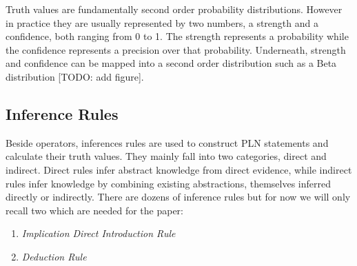 \documentclass[runningheads]{llncs}
\begin{document}
Truth values are fundamentally second order probability
distributions. However in practice they are usually represented by two
numbers, a strength and a confidence, both ranging from 0 to 1.  The
strength represents a probability while the confidence represents a
precision over that probability.  Underneath, strength and confidence
can be mapped into a second order distribution such as a Beta
distribution [TODO: add figure].

\subsection{Inference Rules}

Beside operators, inferences rules are used to construct PLN
statements and calculate their truth values.  They mainly fall into
two categories, direct and indirect.  Direct rules infer abstract
knowledge from direct evidence, while indirect rules infer knowledge
by combining existing abstractions, themselves inferred directly or
indirectly.  There are dozens of inference rules but for now we will
only recall two which are needed for the paper:
\begin{enumerate}
\item \emph{Implication Direct Introduction Rule}
\item \emph{Deduction Rule}
\end{enumerate}
\end{document}
